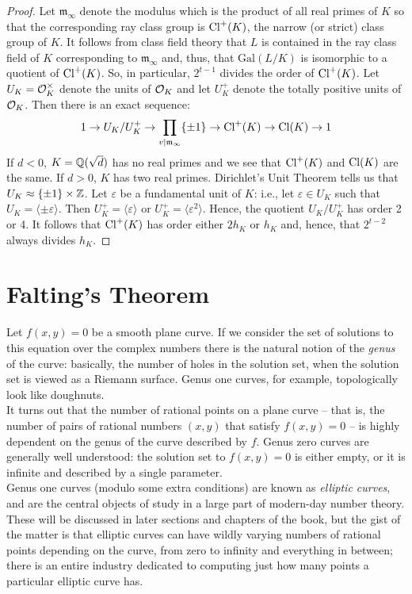 \documentclass{book}
\begin{document}
\begin{proof}
Let $\mathfrak{m}_{\infty}$  denote the modulus which is the product of all
real primes of $K$ so that the corresponding ray class group is $\operatorname{Cl}^+(K)$,
the narrow (or strict) class group of $K$.  It follows from class field
theory that $L$ is contained in the ray class field of $K$ corresponding to
$\mathfrak{m}_\infty$ and, thus, that $\mathrm{Gal}(L/K)$ is isomorphic to a
quotient of $\operatorname{Cl}^+(K)$.  So, in particular, $2^{t-1}$ divides the order of
$\operatorname{Cl}^+(K)$.  Let $U_K = \mathcal{O}_K^\times$ denote the units of $\mathcal{O}_K$ and let
$U_K^+$ denote the totally positive units of $\mathcal{O}_K$.  Then there is an exact
sequence:
$$
1 \rightarrow U_K/U_K^+ \rightarrow \prod_{v|\mathfrak{m}_\infty} \{\pm 1\}
\rightarrow \operatorname{Cl}^+(K) \rightarrow \operatorname{Cl}(K) \rightarrow 1
$$
If $d < 0$, $K = \mathbb{Q}(\sqrt{d})$ has no real primes and we see that $\operatorname{Cl}^+(K)$
and $\operatorname{Cl}(K)$ are the same.  If $d > 0$, $K$ has two real primes.
Dirichlet's Unit Theorem tells us that $U_K \approx \{\pm 1\} \times \mathbb{Z}$.
Let $\varepsilon$ be a fundamental unit of $K$: i.e., let $\varepsilon \in
U_K$ such that $U_K = \langle\pm \varepsilon\rangle$.  Then $U_K^+ = \langle
\varepsilon\rangle$ or $U_K^+ = \langle\varepsilon^2\rangle$.  Hence, the
quotient $U_K/U_K^+$ has order 2 or 4.  It follows that $\operatorname{Cl}^+(K)$ has order
either $2h_K$ or $h_K$ and, hence, that $2^{t-2}$ always divides $h_K$.
\end{proof}

\section{Falting's Theorem}\label{sec:faltings}
Let $f(x,y)=0$ be a smooth plane curve. If we
consider the set of solutions to this equation over
the complex numbers there is the natural notion of
the {\it genus} of the curve: basically, the number
of holes in the solution set, when the solution set
is viewed as a Riemann surface. Genus one curves, for
example, topologically look like doughnuts. \\

It turns out that the number of rational points on a
plane curve -- that is, the number of pairs of
rational numbers $(x,y)$ that satisfy $f(x,y)=0$ --
is highly dependent on the genus of the curve
described by $f$. Genus zero curves are generally
well understood: the solution set to $f(x,y)=0$ is
either empty, or it is infinite and described by a
single parameter. \\

Genus one curves (modulo some extra conditions) are
known as {\it elliptic curves}, and are the central
objects of study in a large part of modern-day number
theory. These will be discussed in later sections and
chapters of the book, but the gist of the matter is
that elliptic curves can have wildly varying numbers
of rational points depending on the curve, from zero
to infinity and everything in between; there is an
entire industry dedicated to computing just how many
points a particular elliptic curve has. \\
\end{document}
